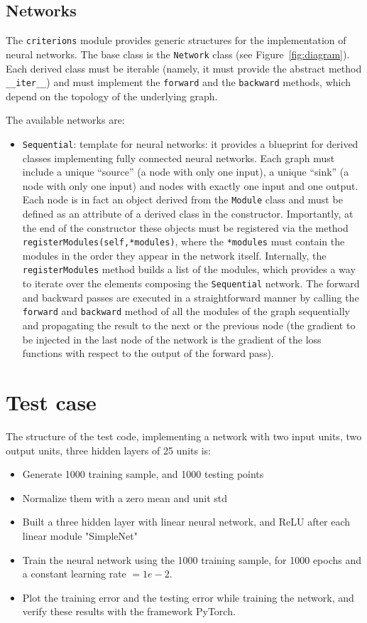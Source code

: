 \documentclass[10pt,final,a4paper]{article}
\begin{document}
\subsection{Networks}
The \verb|criterions| module provides generic structures for the implementation of neural networks. The base class is the \verb|Network| class (see Figure~\ref{fig:diagram}). Each derived class must be iterable (namely, it must provide the abstract method \verb|__iter__|) and must implement the \verb|forward| and the \verb|backward| methods, which depend on the topology of the underlying graph.

The available networks are:
\begin{itemize}
\item \verb|Sequential|: template for neural networks: it provides a blueprint for derived classes implementing fully connected neural networks. Each graph must include a unique ``source'' (a node with only one input), a unique ``sink'' (a node with only one input) and nodes with exactly one input and one output. Each node is in fact an object derived from the \verb|Module| class and must be defined as an attribute of a derived class in the constructor. Importantly, at the end of the constructor these objects must be registered via the method \verb|registerModules(self,*modules)|, where the \verb|*modules| must contain the modules in the order they appear in the network itself. Internally, the \verb|registerModules| method builds a list of the modules, which  provides a way to iterate over the elements composing the \verb|Sequential| network. The forward and backward passes are executed in a straightforward manner by calling the \verb|forward| and \verb|backward| method of all the modules of the graph sequentially and propagating the result to the next or the previous node (the gradient to be injected in the last node of the network is the gradient of the loss functions with respect to the output of the forward pass).
\end{itemize}
\section{Test case}
The structure of the test code, implementing a network with two input units, two output units, three hidden layers of 25 units is:
\begin{itemize}
\item Generate 1000 training sample, and 1000 testing points\\
\item Normalize them with a zero mean and unit std\\
\item Built a three hidden layer with linear neural network, and ReLU after each linear module "SimpleNet"\\
\item Train the neural network using the 1000 training sample, for 1000 epochs and a constant learning rate $=1e-2$.
\item Plot the training error and the testing error while training the network, and verify these results with the framework PyTorch.
\end{itemize}
\end{document}
